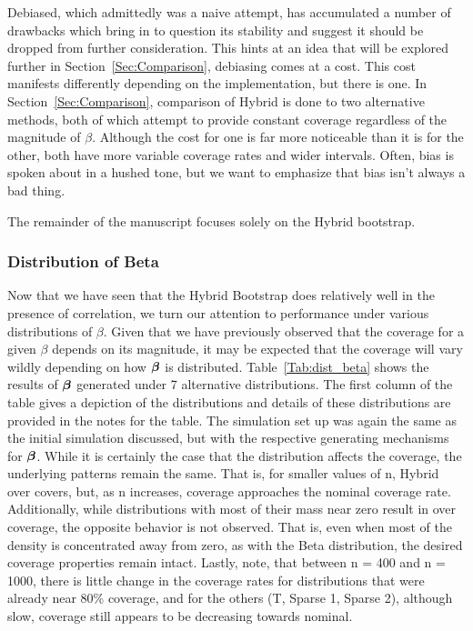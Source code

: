 Debiased, which admittedly was a naive attempt, has accumulated a number of drawbacks which bring in to question its stability and suggest it should be dropped from further consideration. This hints at an idea that will be explored further in Section~\ref{Sec:Comparison}, debiasing comes at a cost. This cost manifests differently depending on the implementation, but there is one. In Section~\ref{Sec:Comparison}, comparison of Hybrid is done to two alternative methods, both of which attempt to provide constant coverage regardless of the magnitude of $\beta$. Although the cost for one is far more noticeable than it is for the other, both have more variable coverage rates and wider intervals. Often, bias is spoken about in a hushed tone, but we want to emphasize that bias isn't always a bad thing. 

The remainder of the manuscript focuses solely on the Hybrid bootstrap.

\subsubsection{Distribution of Beta}\label{Sec:Distribution}

Now that we have seen that the Hybrid Bootstrap does relatively well in the presence of correlation, we turn our attention to performance under various distributions of $\beta$. Given that we have previously observed that the coverage for a given $\beta$ depends on its magnitude, it may be expected that the coverage will vary wildly depending on how $\boldsymbol{\beta}$ is distributed. Table~\ref{Tab:dist_beta} shows the results of $\boldsymbol{\beta}$ generated under 7 alternative distributions. The first column of the table gives a depiction of the distributions and details of these distributions are provided in the notes for the table. The simulation set up was again the same as the initial simulation discussed, but with the respective generating mechanisms for $\boldsymbol{\beta}$. While it is certainly the case that the distribution affects the coverage, the underlying patterns remain the same. That is, for smaller values of n, Hybrid over covers, but, as n increases, coverage approaches the nominal coverage rate. Additionally, while distributions with most of their mass near zero result in over coverage, the opposite behavior is not observed. That is, even when most of the density is concentrated away from zero, as with the Beta distribution, the desired coverage properties remain intact. Lastly, note, that between n = 400 and n = 1000, there is little change in the coverage rates for distributions that were already near 80\% coverage, and for the others (T, Sparse 1, Sparse 2), although slow, coverage still appears to be decreasing towards nominal.

